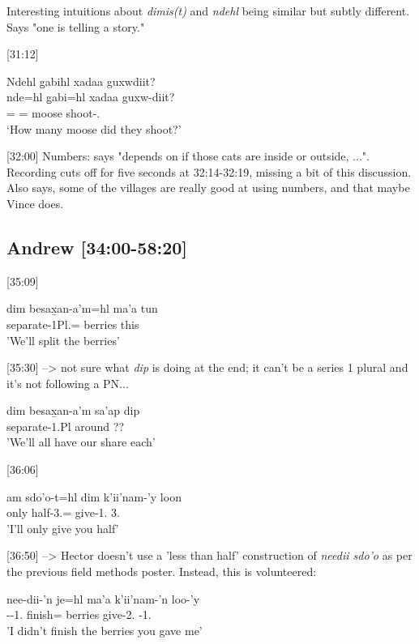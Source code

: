 Interesting intuitions about \textit{dimis(t)} and \textit{ndehl} being similar but subtly different. Says "one is telling a story."

[31:12]
\begin{exe}
    \ex \glll 
    Ndehl g̱abihl xadaa guxwdiit? \\ 
    nde=hl g̱abi=hl xadaa guxw-diit? \\
    \Wh=\Cn{} \Cnt=\Cn{} moose shoot-\Tpl.\Ii \\
    \glt `How many moose did they shoot?'
\end{exe}

[32:00] Numbers: says "depends on if those cats are inside or outside, ...".  Recording cuts off for five seconds at 32:14-32:19, missing a bit of this discussion. Also says, some of the villages are really good at using numbers, and that maybe Vince does.

\subsection{Andrew [34:00-58:20]}

[35:09]
\begin{exe}
\ex \gll dim besax̱an-a'm=hl ma'a tun\\
\Fut{} separate-1Pl.\Ii{}=\Cn{} berries this\\
'We'll split the berries'
\end{exe}

[35:30] --> not sure what \textit{dip} is doing at the end; it can't be a series 1 plural and it's not following a PN...
\begin{exe}
\ex \gll dim besax̱an-a'm sa'ap dip\\
\Fut{} separate-1.Pl\Ii{} around ?? \\
'We'll all have our share each'
\end{exe}

[36:06]
\begin{exe}
\ex {}am sdo'o-t=hl dim k'ii'nam-'y loon\\
only half-3.\I{}=\Cn{} \Fut{} give-1.\Ii{} 3.\Prep{} \\
'I'll only give you half'
\end{exe}

[36:50] --> Hector doesn't use a 'less than half' construction of \textit{needii sdo'o} as per the previous field methods poster. Instead, this is volunteered:
\begin{exe}
\ex \gll nee-dii-'n je=hl ma'a k'ii'nam-'n loo-'y\\
\Neg{}-\Foc{}-1.\I{} finish=\Cn{} berries give-2.\Ii{} \Obl{}-1.\Ii{}\\
'I didn't finish the berries you gave me'
\end{exe}

